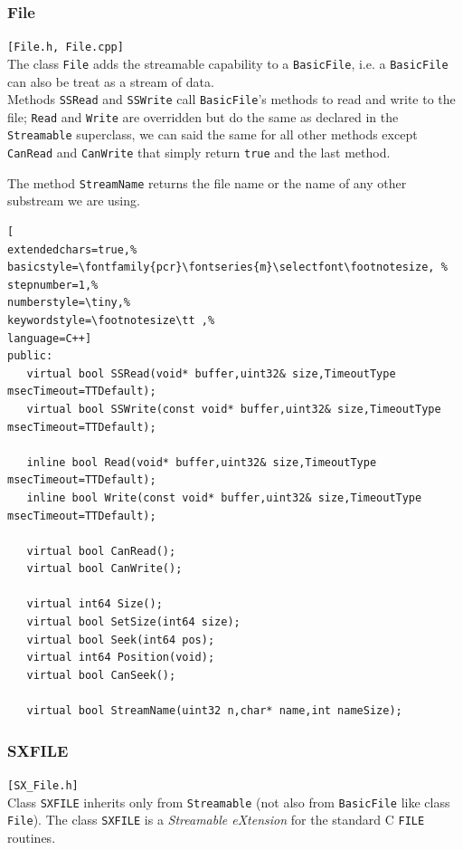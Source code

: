 \subsubsection{File}
\texttt{[File.h, File.cpp]}\\
The class \texttt{File} adds the streamable capability to a \texttt{BasicFile}, i.e. a \texttt{BasicFile} can also be treat as a stream of data.\\

Methods \texttt{SSRead} and \texttt{SSWrite} call \texttt{BasicFile}'s methods to read and write to the file; \texttt{Read} and \texttt{Write} are overridden but do the same as declared in the \texttt{Streamable} superclass, we can said the same for all other methods except \texttt{CanRead} and \texttt{CanWrite} that simply return \texttt{true} and the last method.

The method \texttt{StreamName} returns the file name or the name of any other substream we are using.
\begin{lstlisting}[
extendedchars=true,%
basicstyle=\fontfamily{pcr}\fontseries{m}\selectfont\footnotesize, %
stepnumber=1,%
numberstyle=\tiny,%
keywordstyle=\footnotesize\tt ,%
language=C++]
public:
   virtual bool SSRead(void* buffer,uint32& size,TimeoutType msecTimeout=TTDefault);
   virtual bool SSWrite(const void* buffer,uint32& size,TimeoutType msecTimeout=TTDefault);

   inline bool Read(void* buffer,uint32& size,TimeoutType msecTimeout=TTDefault);
   inline bool Write(const void* buffer,uint32& size,TimeoutType msecTimeout=TTDefault);

   virtual bool CanRead();
   virtual bool CanWrite();

   virtual int64 Size();
   virtual bool SetSize(int64 size);
   virtual bool Seek(int64 pos);
   virtual int64 Position(void);
   virtual bool CanSeek();

   virtual bool StreamName(uint32 n,char* name,int nameSize);
\end{lstlisting}



\subsubsection{SXFILE}
\texttt{[SX\_File.h]}\\
Class \texttt{SXFILE} inherits only from \texttt{Streamable} (not also from \texttt{BasicFile} like class \texttt{File}). The class \texttt{SXFILE} is a \textit{Streamable eXtension} for the standard C \texttt{FILE} routines.\\


